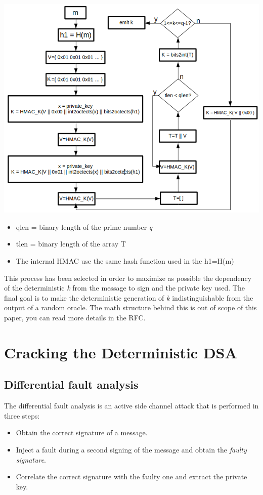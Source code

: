 \documentclass[11pt,english]{article}
\begin{document}
\includegraphics[width=1.0\textwidth]{img/img_2.png} \\

\begin{itemize}
\item qlen = binary length of the prime number \textit{q}
\item tlen = binary length of the array T 
\item The internal HMAC use the same hash function used in the h1=H(m)
\end{itemize}

This process has been selected in order to maximize as possible the dependency of the deterministic \textit{k} from the message to sign and the private key used. The final goal is to make the deterministic generation of \textit{k} indistinguishable from the output of a random oracle. The math structure behind this is out of scope of this paper, you can read more details in the RFC\cite{rfc}. 

\section{Cracking the Deterministic DSA}

\subsection{Differential fault analysis}

The differential fault analysis is an active side channel attack that is performed in three steps:
\begin{itemize}
\item Obtain the correct signature of a message.
\item Inject a fault during a second signing of the message and obtain the \textit{faulty signature}.
\item Correlate the correct signature with the faulty one and extract the private key.
\end{itemize}
\end{document}
